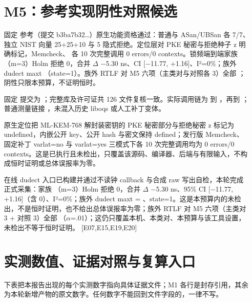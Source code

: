 \documentclass[UTF8,fontset=fandol,11pt,a4paper]{ctexart}
\begin{document}
\section{M5：参考实现阴性对照候选}
固定 \texttt{} 参考（提交 b3ba7b32…）原生功能资格通过：普通与 ASan/UBSan 各 7/7、独立 NIST 向量 25+25+10 与 5 隐式拒绝。定位层对 PKE 秘密与拒绝种子 z 明确标记，Memcheck、\texttt{} 各 10 次完整调用 0 errors/0 contexts。锁频端到端家族 \texttt{}（m=3）Holm 拒绝 0，合并 \texorpdfstring{$\Delta$}{Delta} \texorpdfstring{$-$}{-}5.30 ns、CI [\texorpdfstring{$-$}{-}11.77, +1.16]、I²=0\%；族外 dudect max\textbar{}t\textbar{} \texttt{}（state=1）。族外 RTLF 对 M5 六项（主类对与对照各 3）全部 \texttt{}；阴性只限本预算，不证明恒时。


固定 \texttt{} 提交为 \texttt{}；完整库及许可证共 126 文件复核一致。实际调用链为 \texttt{} 到 \texttt{}，再到 \texttt{}；普通测量链接 \texttt{}，未混入历史 liboqs 或人工补丁变体。


原生定位把 ML-KEM-768 解封装密钥的 PKE 秘密部分与拒绝秘密 z 标记为 undefined，内嵌公开 key、公开 hash 与密文保持 defined；发行版 Memcheck、固定补丁 varlat=no 与 varlat=yes 三模式下各 10 次完整调用均为 0 errors/0 contexts。这是已执行且未检出，只覆盖该源码、编译器、后端与有限输入，不构成恒时证明或总体误报率为零。


在线 dudect 入口已构建并通过不读钟 callback 与合成 raw 写出自检，本轮完成正式采集：家族 \texttt{}（m=3）Holm 拒绝 0，合并 \texorpdfstring{$\Delta$}{Delta} \texorpdfstring{$-$}{-}5.30 ns、95\% CI [\texorpdfstring{$-$}{-}11.77, +1.16]（含 0）、I²=0\%；族外 dudect max\textbar{}t\textbar{} = \texttt{}、state=1。这是本预算内的未检出，不是恒时证明，也不给出总体误报率为零；族外 RTLF 对 M5 六项（主类对 3 + 对照 3）全部 \texttt{}（\texorpdfstring{$\alpha$}{alpha}=.01）；这仍只覆盖本机、本类对、本预算与该工具设置，未检出不等于恒时证明。 [E07,E15,E19,E20]


\section{实测数值、证据对照与复算入口}
下表把本报告出现的每个实测数字指向具体证据文件；M1 各行是封存引用，其余为本轮新增产物的原文数字。任何数字不能回到文件字段的，一律不写。
\end{document}
